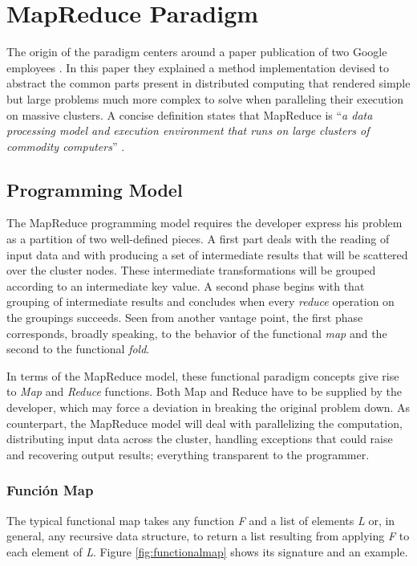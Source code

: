 \section{MapReduce Paradigm}\label{sec:mapred}

\noindent The origin of the paradigm centers around a paper publication of two Google employees \cite{googlemapreduce}. In this paper they explained a method implementation devised to abstract the common parts present in distributed computing that rendered simple but large problems much more complex to solve when paralleling their execution on massive clusters. A concise definition states that MapReduce is ``\textit{a data processing model and execution environment that runs on large clusters of commodity computers}'' \cite{hadoopdefguide}.

\subsection{Programming Model}\label{subsec:programacionmapred}

\noindent The MapReduce programming model requires the developer express his problem as a partition of two well-defined pieces. A first part deals with the reading of input data and with producing a set of intermediate results that will be scattered over the cluster nodes. These intermediate transformations will be grouped according to an intermediate key value. A second phase begins with that grouping of intermediate results and concludes when every \emph{reduce} operation on the groupings succeeds. Seen from another vantage point, the first phase corresponds, broadly speaking, to the behavior of the functional \emph{map} and the second to the functional \emph{fold}.

In terms of the MapReduce model, these functional paradigm concepts give rise to \emph{Map} and \emph{Reduce} functions. Both Map and Reduce have to be supplied by the developer, which may force a deviation in breaking the original problem down. As counterpart, the MapReduce model will deal with parallelizing the computation, distributing input data across the cluster, handling exceptions that could raise and recovering output results; everything transparent to the programmer.

\subsubsection{Funci\'on Map}\label{map}

\noindent The typical functional map takes any function \emph{F} and a list of elements \emph{L} or, in general, any recursive data structure, to return a list resulting from applying \emph{F} to each element of \emph{L}. Figure \ref{fig:functionalmap} shows its signature and an example.


